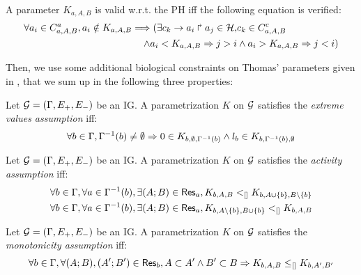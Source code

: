 \begin{property}\label{pro:K-valid}
A parameter $K_{a,A,B}$ is valid w.r.t. the PH iff the following equation is verified:
\begin{align*}
\forall a_i\in C^a_{a,A,B},
		a_i \notin K_{a,A,B} \Longrightarrow (
  \exists c_k\rightarrow a_i\Rsh a_j\in\mathcal{H}, & c_k \in C^c_{a,A,B} \\
 \wedge a_i < K_{a,A,B} \Rightarrow j > i 
 & \wedge  a_i > K_{a,A,B} \Rightarrow j <i )
\end{align*}
\end{property}
		

Then, we use some additional biological constraints on Thomas' parameters given in
\cite{BernotSemBRN}, that we sum up in the following three properties:

\begin{property}
Let $\mathcal{G} = (\Gamma, E_+, E_-)$ be an IG. A parametrization $K$ on $\mathcal{G}$ satisfies the \emph{extreme values assumption} iff:
\label{prop:param_enum_extreme}
\[
  \forall b \in \Gamma, \Gamma^{-1}(b) \neq \emptyset \Rightarrow 0 \in K_{b,\emptyset,\Gamma^{-1}(b)} \wedge l_b \in K_{b,\Gamma^{-1}(b),\emptyset}
\]
\end{property}

\begin{property}
\label{prop:param_enum_activity}
Let $\mathcal{G} = (\Gamma, E_+, E_-)$ be an IG. A parametrization $K$ on $\mathcal{G}$ satisfies the \emph{activity assumption} iff:
\begin{align*}
  \forall b \in \Gamma, \forall a \in \Gamma^{-1}(b), \exists (A;B) \in \mathsf{Res}_{a}, K_{b,A,B} <_{[]} K_{b,A \cup \{b\},B \setminus \{b\}}
\\
  \forall b \in \Gamma, \forall a \in \Gamma^{-1}(b), \exists (A;B) \in \mathsf{Res}_{a}, K_{b,A \setminus \{b\},B \cup \{b\}} <_{[]} K_{b,A,B}
\end{align*}
\end{property}

\begin{property}
\label{prop:param_enum_monotonicity}
Let $\mathcal{G} = (\Gamma, E_+, E_-)$ be an IG. A parametrization $K$ on $\mathcal{G}$ satisfies the \emph{monotonicity assumption} iff:
\[
  \forall b \in \Gamma, \forall (A;B), (A';B') \in \mathsf{Res}_{b},
  A \subset A' \wedge B' \subset B \Rightarrow K_{b,A,B} \leq_{[]} K_{b,A',B'}
\]
\end{property}

